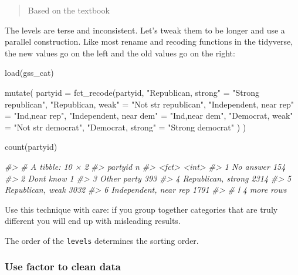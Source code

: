 \documentclass[
]{article}
\newenvironment{Shaded}{}{}
\newcommand{\AttributeTok}[1]{\textcolor[rgb]{0.49,0.56,0.16}{#1}}
\newcommand{\CommentTok}[1]{\textcolor[rgb]{0.38,0.63,0.69}{\textit{#1}}}
\newcommand{\FunctionTok}[1]{\textcolor[rgb]{0.02,0.16,0.49}{#1}}
\newcommand{\NormalTok}[1]{#1}
\newcommand{\OtherTok}[1]{\textcolor[rgb]{0.00,0.44,0.13}{#1}}
\newcommand{\StringTok}[1]{\textcolor[rgb]{0.25,0.44,0.63}{#1}}
\begin{document}
\begin{quote}
Based on the textbook
\end{quote}

The levels are terse and inconsistent. Let's tweak them to be longer and
use a parallel construction. Like most rename and recoding functions in
the tidyverse, the new values go on the left and the old values go on
the right:

\begin{Shaded}
\begin{Highlighting}[]
\FunctionTok{load}\NormalTok{(gss\_cat)}

\FunctionTok{mutate}\NormalTok{(}
  \AttributeTok{partyid =} \FunctionTok{fct\_recode}\NormalTok{(partyid,}
    \StringTok{"Republican, strong"}    \OtherTok{=} \StringTok{"Strong republican"}\NormalTok{,}
    \StringTok{"Republican, weak"}      \OtherTok{=} \StringTok{"Not str republican"}\NormalTok{,}
    \StringTok{"Independent, near rep"} \OtherTok{=} \StringTok{"Ind,near rep"}\NormalTok{,}
    \StringTok{"Independent, near dem"} \OtherTok{=} \StringTok{"Ind,near dem"}\NormalTok{,}
    \StringTok{"Democrat, weak"}        \OtherTok{=} \StringTok{"Not str democrat"}\NormalTok{,}
    \StringTok{"Democrat, strong"}      \OtherTok{=} \StringTok{"Strong democrat"}
\NormalTok{  )}
\NormalTok{) }

\FunctionTok{count}\NormalTok{(partyid)}

\CommentTok{\#\textgreater{} \# A tibble: 10 × 2}
\CommentTok{\#\textgreater{}   partyid                   n}
\CommentTok{\#\textgreater{}   \textless{}fct\textgreater{}                 \textless{}int\textgreater{}}
\CommentTok{\#\textgreater{} 1 No answer               154}
\CommentTok{\#\textgreater{} 2 Don\textquotesingle{}t know                1}
\CommentTok{\#\textgreater{} 3 Other party             393}
\CommentTok{\#\textgreater{} 4 Republican, strong     2314}
\CommentTok{\#\textgreater{} 5 Republican, weak       3032}
\CommentTok{\#\textgreater{} 6 Independent, near rep  1791}
\CommentTok{\#\textgreater{} \# ℹ 4 more rows}
\end{Highlighting}
\end{Shaded}

Use this technique with care: if you group together categories that are
truly different you will end up with misleading results.

The order of the \texttt{levels} determines the sorting order.

\hypertarget{use-factor-to-clean-data}{%
\subsubsection{Use factor to clean
data}\label{use-factor-to-clean-data}}
\end{document}
